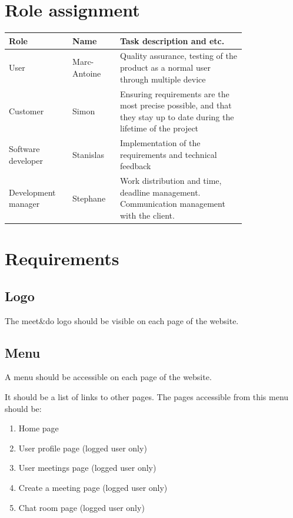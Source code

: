 \documentclass[conference]{IEEEtran}
\begin{document}
\clearpage
\section{Role assignment}

\begin{tabular}[h!]{ |p{0.2\linewidth}|p{0.15\linewidth}|p{0.45\linewidth}| }
\hline
Role & Name & Task description and etc. \\
\hline
User & Marc-Antoine & Quality assurance, testing of the product as a normal user through multiple device \\
\hline
Customer & Simon & Ensuring requirements are the most precise possible, and that they stay up to date during the lifetime of the project \\
\hline
Software developer & Stanislas & Implementation of the requirements and technical feedback \\
\hline
Development manager & Stephane & Work distribution and time, deadline management. Communication management with the client. \\
\hline
\end{tabular}

\section{Requirements}

\subsection{Logo}

The meet\&do logo should be visible on each page of the website.

\subsection{Menu}

A menu should be accessible on each page of the website. 

It should be a list of links to other pages. 
The pages accessible from this menu should be:

\begin{enumerate}
    \item Home page
    \item User profile page (logged user only)
    \item User meetings page (logged user only)
    \item Create a meeting page (logged user only)
    \item Chat room page (logged user only)
\end{enumerate}
\end{document}
